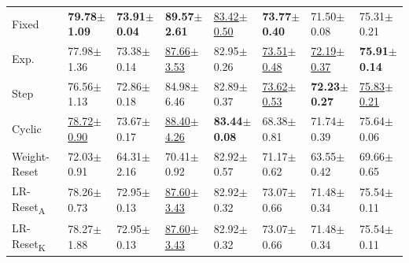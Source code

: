 \documentclass{article} %
\begin{document}
\begin{table}[ht]
\begin{tabular}{llllllll}
      Fixed                     & \bfseries 79.78$\pm$1.09   & \bfseries 73.91$\pm$0.04 & \bfseries 89.57$\pm$2.61   & \underline{83.42$\pm$0.50} & \bfseries 73.77$\pm$0.40   & 71.50$\pm$0.08             & 75.31$\pm$0.21             \\
      Exp.                      & 77.98$\pm$1.36             & 73.38$\pm$0.14           & \underline{87.66$\pm$3.53} & 82.95$\pm$0.26             & \underline{73.51$\pm$0.48} & \underline{72.19$\pm$0.37} & \bfseries 75.91$\pm$0.14   \\
      Step                      & 76.56$\pm$1.13             & 72.86$\pm$0.18           & 84.98$\pm$6.46             & 82.89$\pm$0.37             & \underline{73.62$\pm$0.53} & \bfseries 72.23$\pm$0.27   & \underline{75.83$\pm$0.21} \\
      Cyclic                    & \underline{78.72$\pm$0.90} & 73.67$\pm$0.17           & \underline{88.40$\pm$4.26} & \bfseries 83.44$\pm$0.08   & 68.38$\pm$0.81             & 71.74$\pm$0.39             & 75.64$\pm$0.06             \\
      Weight-Reset              & 72.03$\pm$0.91             & 64.31$\pm$2.16           & 70.41$\pm$0.92             & 82.92$\pm$0.57             & 71.17$\pm$0.62             & 63.55$\pm$0.42             & 69.66$\pm$0.65             \\
      LR-Reset\textsubscript{A} & 78.26$\pm$0.73             & 72.95$\pm$0.13           & \underline{87.60$\pm$3.43} & 82.92$\pm$0.32             & 73.07$\pm$0.66             & 71.48$\pm$0.34             & 75.54$\pm$0.11             \\
      LR-Reset\textsubscript{K} & 78.27$\pm$1.88             & 72.95$\pm$0.13           & \underline{87.60$\pm$3.43} & 82.92$\pm$0.32             & 73.07$\pm$0.66             & 71.48$\pm$0.34             & 75.54$\pm$0.11             \\
      \bottomrule
   \end{tabular}
   \label{tab:lr_resetting}
\end{table}
\end{document}
